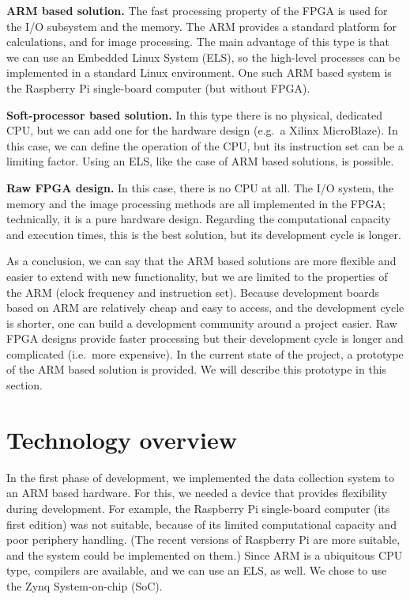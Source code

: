 \documentclass[b5paper,12pt]{report}
\theoremstyle{definition}
\begin{document}
{\bf{ARM based solution.}} The fast processing property of the FPGA is used for the I/O subsystem and the memory. The ARM provides a standard platform for calculations, and for image processing. The main advantage of this type is that we can use an Embedded Linux System (ELS), so the high-level processes can be implemented in a standard Linux environment. One such ARM based system is the Raspberry Pi single-board computer (but without FPGA).

{\bf{Soft-processor based solution.}} In this type there is no physical, dedicated CPU, but we can add one for the hardware design (e.g.~a Xilinx MicroBlaze). In this case, we can define the operation of the CPU, but its instruction set can be a limiting factor. Using an ELS, like the case of ARM based solutions, is possible.

{\bf{Raw FPGA design.}} In this case, there is no CPU at all. The I/O system, the memory and the image processing methods are all implemented in the FPGA; technically, it is a pure hardware design. Regarding the computational capacity and execution times, this is the best solution, but its development cycle is longer.

As a conclusion, we can say that the ARM based solutions are more flexible and easier to extend with new functionality, but we are limited to the properties of the ARM (clock frequency and instruction set). Because development boards based on ARM are relatively cheap and easy to access, and the development cycle is shorter, one can build a development community around a project easier. Raw FPGA designs provide faster processing but their development cycle is longer and complicated (i.e.~more expensive). In the current state of the project, a prototype of the ARM based solution is provided. We will describe this prototype in this section.

\section{Technology overview}

In the first phase of development, we implemented the data collection system to an ARM based hardware. For this, we needed a device that provides flexibility during development. For example, the Raspberry Pi single-board computer (its first edition) was not suitable, because of its limited computational capacity and poor periphery handling. (The recent versions of Raspberry Pi are more suitable, and the system could be implemented on them.) Since ARM is a ubiquitous CPU type, compilers are available, and we can use an ELS, as well. We chose to use the Zynq System-on-chip (SoC).
\end{document}
